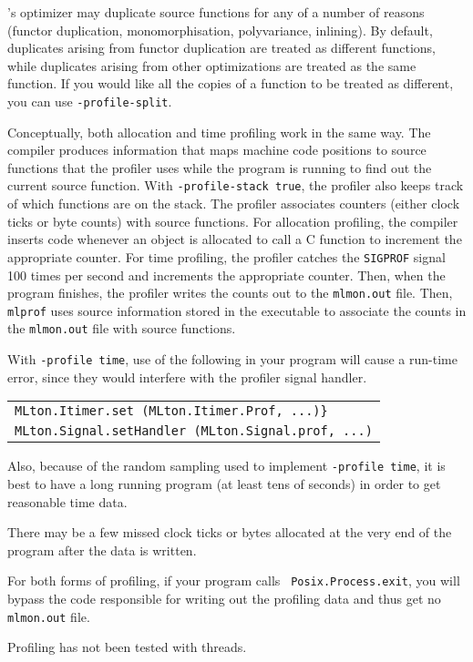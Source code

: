 {\mlton}'s optimizer may duplicate source functions for any of a
number of reasons (functor duplication, monomorphisation,
polyvariance, inlining).  By default, duplicates arising from functor
duplication are treated as different functions, while duplicates
arising from other optimizations are treated as the same function.
If you would like all the copies of a function to be treated
as different, you can use {\tt -profile-split}.

Conceptually, both allocation and time profiling work in the same way.
The compiler produces information that maps machine code positions to
source functions that the profiler uses while the program is running
to find out the current source function.  With {\tt -profile-stack
true}, the profiler also keeps track of which functions are on the
stack.  The profiler associates counters (either clock ticks or byte
counts) with source functions.  For allocation profiling, the compiler
inserts code whenever an object is allocated to call a C function to
increment the appropriate counter.  For time profiling, the profiler
catches the {\tt SIGPROF} signal 100 times per second and increments
the appropriate counter.  Then, when the program finishes, the
profiler writes the counts out to the {\tt mlmon.out} file.  Then,
{\tt mlprof} uses source information stored in the executable to
associate the counts in the {\tt mlmon.out} file with source
functions.

With {\tt -profile time}, use of the following in your program will
cause a run-time error, since they would interfere with the profiler
signal handler.\\
\begin{tabular}{l}
\tt MLton.Itimer.set (MLton.Itimer.Prof, ...)\}\\
\tt MLton.Signal.setHandler (MLton.Signal.prof, ...)
\end{tabular}
Also, because of the random sampling used to implement {\tt -profile
time}, it is best to have a long running program (at least tens of
seconds) in order to get reasonable time data.

There may be a few missed clock ticks or bytes allocated at the
very end of the program after the data is written.

For both forms of profiling, if your program calls {\tt
Posix.Process.exit}, you will bypass the code responsible for writing
out the profiling data and thus get no {\tt mlmon.out} file.

Profiling has not been tested with threads.
